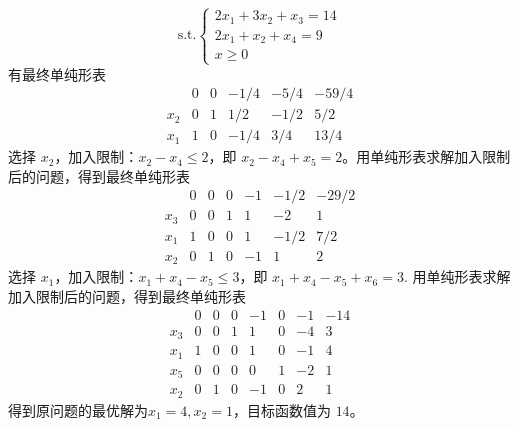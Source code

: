 $$
\text{s.t.} 
\begin{cases}
    2x_1 + 3x_2 + x_3 = 14 \\
    2x_1 + x_2 + x_4 = 9 \\
    x \ge 0
\end{cases}
$$
有最终单纯形表
$$
\begin{array}{c|cccc|c} & 0 & 0 & -1/4 & -5/4 & -59/4 \\ \hline x_2 & 0 & 1 & 1/2 & -1/2 & 5/2 \\ x_1 & 1 & 0 & -1/4 & 3/4 & 13/4 \end{array}
$$
选择 $x_2$，加入限制：$x_2 - x_4 \le 2$，即 $x_2 - x_4 + x_5 = 2$。用单纯形表求解加入限制后的问题，得到最终单纯形表
$$
\begin{array}{c|ccccc|c} & 0 & 0 & 0 & -1 & -1/2 & -29/2 \\ \hline x_3 & 0 & 0 & 1 & 1 & -2 & 1 \\ x_1 & 1 & 0 & 0 & 1 & -1/2 & 7/2 \\ x_2 & 0 & 1 & 0 & -1 & 1 & 2 \end{array}
$$
选择 $x_1$，加入限制：$x_1 + x_4 - x_5 \le 3$，即 $x_1 + x_4 - x_5 + x_6 = 3$. 用单纯形表求解加入限制后的问题，得到最终单纯形表
$$
\begin{array}{c|cccccc|c} & 0 & 0 & 0 & -1 & 0 & -1 & -14 \\ \hline x_3 & 0 & 0 & 1 & 1 & 0 & -4 & 3 \\ x_1 & 1 & 0 & 0 & 1 & 0 & -1 & 4 \\ x_5 & 0 & 0 & 0 & 0 & 1 & -2 & 1 \\ x_2 & 0 & 1 & 0 & -1 & 0 & 2 & 1 \end{array}
$$
得到原问题的最优解为$x_1 = 4, x_2 = 1$​，目标函数值为 $14$。

